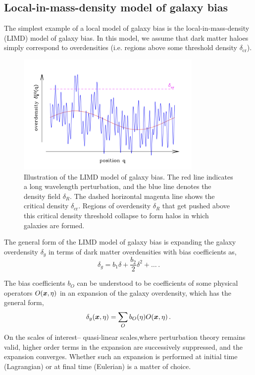 \subsection{Local-in-mass-density model of galaxy bias}

The simplest example of a local model of galaxy bias is the local-in-mass-density (LIMD) model of galaxy bias. In this model, we assume that dark matter haloes simply correspond to overdensities (i.e. regions above some threshold density $\delta_\mathrm{cr}$).

\begin{figure}[!ht]
	\centering
	\includegraphics[width=0.8\textwidth]{fig/limdcartoon.png}
	\caption{Illustration of the LIMD model of galaxy bias. The red line indicates a long wavelength perturbation, and the blue line denotes the density field $\delta_R$. The dashed horizontal magenta line shows the critical density $\delta_{\mathrm{cr}}$. Regions of overdensity $\delta_R$ that get pushed above this critical density threshold collapse to form halos in which galaxies are formed.}
	\label{fig:limdcartoon}
\end{figure}

\iffalse
The general form of the LIMD model of galaxy bias is expanding the galaxy overdensity $\delta_g$ in terms of dark matter overdensities with bias coefficients as, 
\begin{equation}
	\delta_g = b_1 \delta + \frac{b_2}{2} \delta^2 + \ldots\,.
\end{equation}

The bias coefficients $b_O$ can be understood to be coefficients of some physical operators $O(\bm {x},\eta)$ in an expansion of the galaxy overdensity, which has the general form,
\begin{equation}
	\delta_g(\bm {x},\eta) = \sum_O b_O(\eta) O(\bm {x},\eta)\,.
\end{equation}
On the scales of interest-- quasi-linear scales,where perturbation theory remains valid, higher order terms in the expansion are successively suppressed, and the expansion converges. Whether such an expansion is performed at initial time (Lagrangian) or at final time (Eulerian) is a matter of choice.


